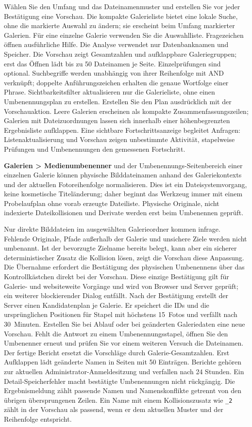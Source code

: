 \documentclass[11pt,a4paper]{article}
\newcommand{\ui}[1]{\textbf{#1}}
\newcommand{\codeword}[1]{\nolinkurl{#1}}
\begin{document}
Wählen Sie den Umfang und das Dateinamenmuster und erstellen Sie vor jeder
Bestätigung eine Vorschau. Die kompakte Galerieliste bietet eine lokale Suche,
ohne die markierte Auswahl zu ändern; sie erscheint beim Umfang markierter
Galerien. Für eine einzelne Galerie verwenden Sie die Auswahlliste. Fragezeichen
öffnen ausführliche Hilfe. Die Analyse verwendet nur Datenbanknamen und Speicher.
Die Vorschau zeigt Gesamtzahlen und aufklappbare Galeriegruppen; erst das Öffnen
lädt bis zu 50 Dateinamen je Seite. Einzelprüfungen sind optional. Suchbegriffe werden unabhängig von ihrer
Reihenfolge mit AND verknüpft; doppelte Anführungszeichen erhalten die genaue
Wortfolge einer Phrase. Sichtbarkeitsfilter aktualisieren nur die Galerieliste,
ohne einen Umbenennungsplan zu erstellen. Erstellen Sie den Plan ausdrücklich
mit der Vorschauaktion. Leere Galerien erscheinen als kompakte
Zusammenfassungszeilen; Galerien mit Dateizuordnungen lassen sich innerhalb
einer höhenbegrenzten Ergebnisliste aufklappen. Eine sichtbare
Fortschrittsanzeige begleitet Anfragen: Listenaktualisierung und Vorschau zeigen
unbestimmte Aktivität, stapelweise Prüfungen und Umbenennungen den gemessenen
Fortschritt.

\ui{Galerien > Medienumbenenner} und der Umbenennungs-Seitenbereich einer
einzelnen Galerie können physische Bilddateinamen anhand des Galeriekontexts und
der aktuellen Fotoreihenfolge normalisieren. Dies ist ein Dateisystemvorgang,
keine kosmetische Titeländerung; daher beginnt das Werkzeug immer mit einem
Probelaufplan ohne vorab erzeugte Dateiliste. Physische Originale, nicht
indexierte Dateikollisionen und Derivate werden erst beim Umbenennen geprüft.

Nur direkte Bilddateien im ausgewählten Galerieordner kommen infrage. Fehlende
Originale, Pfade außerhalb der Galerie und unsichere Ziele werden nicht
umbenannt. Ist der bevorzugte Zielname bereits belegt, kann aber ein sicherer
deterministischer Zusatz die Kollision lösen, zeigt die Vorschau diese
Anpassung. Die Übernahme erfordert die Bestätigung des physischen Umbenennens
über das Kontrollkästchen direkt bei der Vorschau.
Diese einzige Bestätigung gilt für Galerie- und websiteweite Vorgänge und wird
von Browser und Server geprüft; ein weiterer blockierender Dialog entfällt.
Nach der Bestätigung erstellt der Server einen Kandidatenplan je Galerie.
Er speichert die IDs und die ursprünglichen Positionen für Stapel mit höchstens
15~Fotos und verfällt nach 30~Minuten. Erstellen Sie bei Ablauf oder bei
geänderten Galeriedaten eine neue Vorschau. Fehlt die Antwort zu einem
Umbenennungsstapel, öffnen Sie den Umbenenner erneut und prüfen Sie vor einem
weiteren Versuch die Dateinamen.
Der fertige Bericht ersetzt die Vorschläge durch Galerie-Gesamtzahlen. Erst
Aufklappen lädt geänderte Namen in Seiten mit 50 Einträgen. Berichte gehören
zur aktuellen Administrator-Anmeldesitzung und verfallen nach 24 Stunden.
Ein Detail-Speicherfehler macht bestätigte Umbenennungen nicht rückgängig.
Die Ergebnismeldung zählt passende Namen und Namenskonflikte getrennt
von den übrigen übersprungenen Zeilen.
Ein Name mit einem Kollisionszusatz wie \codeword{\_2} zählt in der Vorschau
als passend, wenn er dem aktuellen Muster und der Reihenfolge entspricht.
\end{document}
